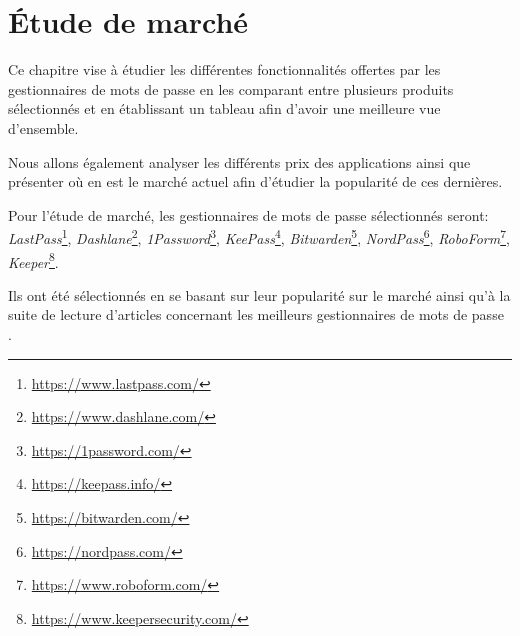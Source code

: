 


\chapter{Étude de marché}
\label{ch:etude_marche}
Ce chapitre vise à étudier les différentes fonctionnalités offertes par les gestionnaires de mots de passe en les comparant entre plusieurs produits sélectionnés et en établissant un tableau afin d'avoir une meilleure vue d'ensemble.

Nous allons également analyser les différents prix des applications ainsi que présenter où en est le marché actuel afin d'étudier la popularité de ces dernières.

Pour l'étude de marché, les gestionnaires de mots de passe sélectionnés seront: \textit{LastPass}\footnote{\href{https://www.lastpass.com/}{https://www.lastpass.com/}}, \textit{Dashlane}\footnote{\href{https://www.dashlane.com/}{https://www.dashlane.com/}}, \textit{1Password}\footnote{\href{https://1password.com/}{https://1password.com/}}, \textit{KeePass}\footnote{\href{https://keepass.info/}{https://keepass.info/}}, \textit{Bitwarden}\footnote{\href{https://bitwarden.com/}{https://bitwarden.com/}}, \textit{NordPass}\footnote{\href{https://nordpass.com/}{https://nordpass.com/}}, \textit{RoboForm}\footnote{\href{https://www.roboform.com/}{https://www.roboform.com/}}, \textit{Keeper}\footnote{\href{https://www.keepersecurity.com/}{https://www.keepersecurity.com/}}.

Ils ont été sélectionnés en se basant sur leur popularité sur le marché ainsi qu'à la suite de lecture d'articles concernant les meilleurs gestionnaires de mots de passe \cite{BPM22}\cite{gallagher19}\cite{MSPM22}\cite{PM22}.
